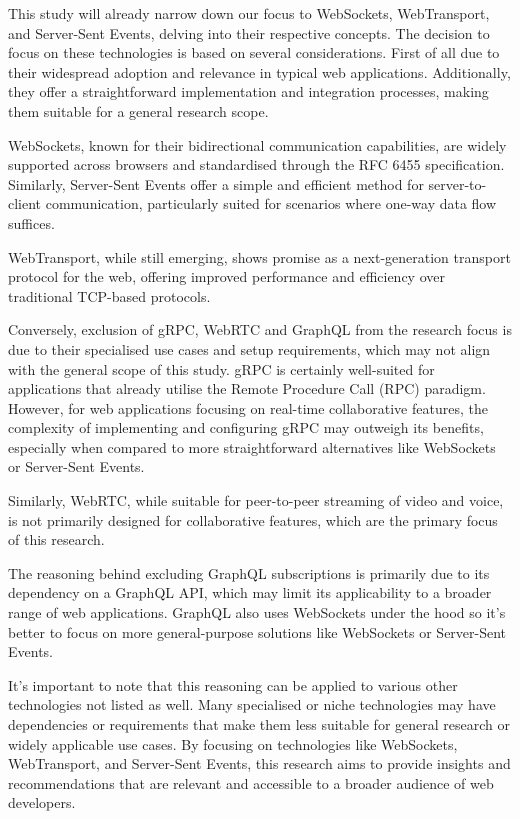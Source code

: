 This study will already narrow down our focus to WebSockets, WebTransport, and Server-Sent Events, delving into their respective concepts. The decision to focus on these technologies is based on several considerations. First of all due to their widespread adoption and relevance in typical web applications. Additionally, they offer a straightforward implementation and integration processes, making them suitable for a general research scope.

WebSockets, known for their bidirectional communication capabilities, are widely supported across browsers and standardised through the RFC 6455 specification. Similarly, Server-Sent Events offer a simple and efficient method for server-to-client communication, particularly suited for scenarios where one-way data flow suffices.

WebTransport, while still emerging, shows promise as a next-generation transport protocol for the web, offering improved performance and efficiency over traditional TCP-based protocols.

Conversely, exclusion of gRPC, WebRTC and GraphQL from the research focus is due to their specialised use cases and setup requirements, which may not align with the general scope of this study. gRPC is certainly well-suited for applications that already utilise the Remote Procedure Call (RPC) paradigm. However, for web applications focusing on real-time collaborative features, the complexity of implementing and configuring gRPC may outweigh its benefits, especially when compared to more straightforward alternatives like WebSockets or Server-Sent Events.

Similarly, WebRTC, while suitable for peer-to-peer streaming of video and voice, is not primarily designed for collaborative features, which are the primary focus of this research.

The reasoning behind excluding GraphQL subscriptions is primarily due to its dependency on a GraphQL API, which may limit its applicability to a broader range of web applications. GraphQL also uses WebSockets under the hood so it's better to focus on more general-purpose solutions like WebSockets or Server-Sent Events.

It's important to note that this reasoning can be applied to various other technologies not listed as well. Many specialised or niche technologies may have dependencies or requirements that make them less suitable for general research or widely applicable use cases. By focusing on technologies like WebSockets, WebTransport, and Server-Sent Events, this research aims to provide insights and recommendations that are relevant and accessible to a broader audience of web developers.

